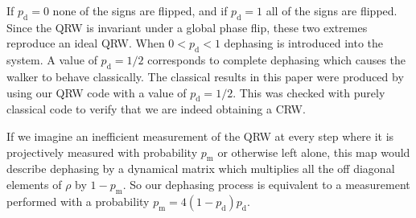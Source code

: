 \documentclass[aps,pra,twocolumn,amsmath,amssymb,nofootinbib,superscriptaddress]{revtex4}
\begin{document}
If $p_{\mathrm{d}}=0$ none of the signs are flipped, and if $p_{\mathrm{d}}=1$ all of the signs are flipped. Since the QRW is invariant under a global phase flip, these two extremes reproduce an ideal QRW. When $0<p_{\mathrm{d}} <1$ dephasing is introduced into the system. A value of $p_{\mathrm{d}}=1/2$ corresponds to complete dephasing which causes the walker to behave classically. The classical results in this paper were produced by using our QRW code with a value of $p_{\mathrm{d}}=1/2$. This was checked with purely classical code to verify that we are indeed obtaining a CRW. 

If we imagine an inefficient measurement of the QRW at every step where it is projectively measured with probability $p_{\mathrm{m}}$ or otherwise left alone, this map would describe dephasing by a dynamical matrix which multiplies all the off diagonal elements of $\rho$ by $1-p_{\mathrm{m}}$. So our dephasing process is equivalent to a measurement performed with a probability $p_{\mathrm{m}}=4(1-p_{\mathrm{d}})p_{\mathrm{d}}$.
\end{document}
